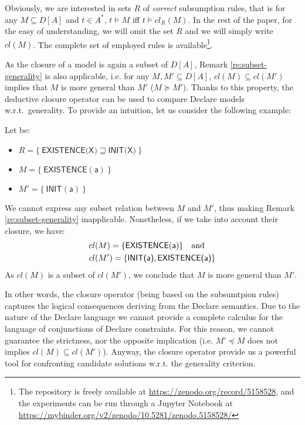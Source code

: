 \noindent Obviously, we are interested in sets $R$ of \emph{correct} subsumption rules, that is for any $M\subseteq D[A]$ and $t\in A^*$, $t\models M$ iff $t\models cl_R(M)$. In the rest of the paper, for the easy of understanding, we will omit the set $R$ and we will simply write $cl(M)$. The complete set of employed rules is available\footnote{The repository is freely available at \url{https://zenodo.org/record/5158528}, and the experiments can be run through a Jupyter Notebook at \url{https://mybinder.org/v2/zenodo/10.5281/zenodo.5158528/}}.


As the closure of a model is again a subset of $D[A]$, Remark \ref{re:subset-generality} is also applicable, i.e. for any $M, M'\subseteq D[A]$, $cl(M)\subseteq cl(M')$ implies that $M$ is more general than $M'$ ($M\succeq M'$).
%
%
Thanks to this property, the deductive closure operator can be used to compare Declare models w.r.t.~generality. To provide an intuition, let us consider the following example:

\begin{example}
Let be:
\begin{itemize}
\item $R=\{\ \textsf{EXISTENCE(X)} \sqsupseteq \textsf{INIT(X)}\ \}$
\item $M = \{\ \mathsf{EXISTENCE(a)}\ \}$
\item $M' = \{\ \mathsf{INIT(a)}\ \}$
\end{itemize}
We cannot express any subset relation between $M$ and $M'$, thus making Remark \ref{re:subset-generality} inapplicable.
Nonetheless, if we take into account their closure, we have:
\begin{align*}
	& cl(M)=\{\mathsf{EXISTENCE(a)}\}\quad \textnormal{and} \\
	& cl(M')=\{\textsf{INIT(a)}, \textsf{EXISTENCE(a)}\}
\end{align*}
As $cl(M)$ is a subset of $cl(M')$, we conclude that $M$ is more general than $M'$.
\end{example}
%
\noindent In other words, the closure operator (being based on the subsumtpion rules) captures the logical consequences deriving from the Declare semantics.
Due to the nature of the Declare language we cannot provide a complete calculus for the language of conjunctions of Declare constraints. For this reason, we cannot guarantee the strictness, nor the opposite implication (i.e. $M'\preceq M$ does not implies $cl(M)\subseteq cl(M')$). Anyway, the closure operator provide us a powerful tool for confronting candidate solutions w.r.t. the generality criterion.



